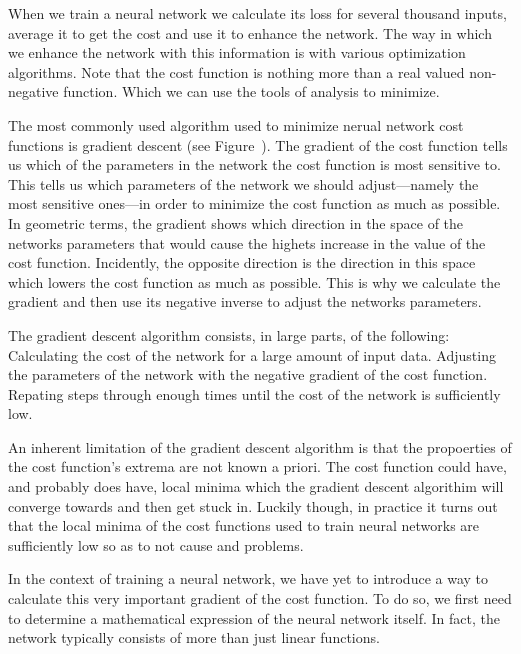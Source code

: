 When we train a neural network we calculate its loss for several thousand inputs, average it to get the cost and use it to enhance the network.
The way in which we enhance the network with this information is with various optimization algorithms.
Note that the cost function is nothing more than a real valued non-negative function.
Which we can use the tools of analysis to minimize.

The most commonly used algorithm used to minimize nerual network cost functions is gradient descent (see Figure~\in[gradient]).
The gradient of the cost function tells us which of the parameters in the network the cost function is most sensitive to.
This tells us which parameters of the network we should adjust---namely the most sensitive ones---in order to minimize the cost function as much as possible.
In geometric terms, the gradient shows which direction in the space of the networks parameters that would cause the highets increase in the value of the cost function.
Incidently, the opposite direction is the direction in this space which lowers the cost function as much as possible.
This is why we calculate the gradient and then use its negative inverse to adjust the networks parameters. 

The gradient descent algorithm consists, in large parts, of the following:
\startitemize[n]
\startitem[step1]
    Calculating the cost of the network for a large amount of input data.
\stopitem
\startitem[step2]
    Adjusting the parameters of the network with the negative gradient of the cost function.
\stopitem
\startitem
    Repating steps \in[step1] through \in[step2] enough times until the cost of the network is sufficiently low. 
\stopitem
\stopitemize

An inherent limitation of the gradient descent algorithm is that the propoerties of the cost function's extrema are not known a priori.
The cost function could have, and probably does have, local minima which the gradient descent algorithim will converge towards and then get stuck in.
Luckily though, in practice it turns out that the local minima of the cost functions used to train neural networks are sufficiently low so as to not cause and problems.

\startplacefigure[
    reference=gradient,
    location=bottom,
    title={Visualization of gradient descent \cite[s_2019].},
]
\stopplacefigure

In the context of training a neural network, we have yet to introduce a way to calculate this very important gradient of the cost function. 
To do so, we first need to determine a mathematical expression of the neural network itself.
In fact, the network typically consists of more than just linear functions.

